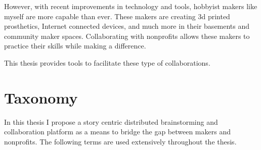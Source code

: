  However, with recent improvements in technology and tools, hobbyist makers like myself are more capable than ever.  These makers are creating 3d printed prosthetics, Internet connected devices, and much more in their basements and community maker spaces. Collaborating with nonprofits allows these makers to practice their skills while making a difference. 

This thesis provides tools to facilitate these type of collaborations.


\section{Taxonomy}
In this thesis I propose a story centric distributed brainstorming and collaboration platform as a means to bridge the gap between makers and nonprofits. The following terms are used extensively throughout the thesis.


